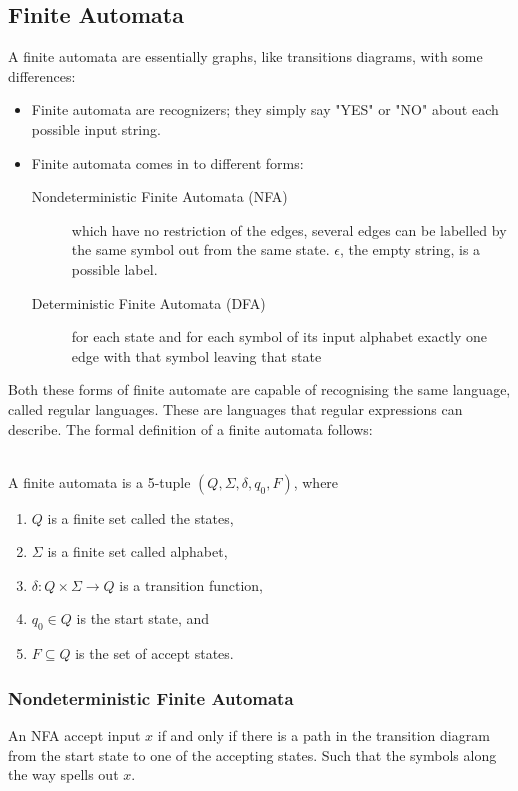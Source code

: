 \subsection{Finite Automata}
A finite automata are essentially graphs, like transitions diagrams, with some 
differences:
\begin{itemize}
  \item Finite automata are recognizers; they simply say "YES" or "NO" about 
each possible input string.
  \item Finite automata comes in to different forms:
    \begin{description}
      \item [Nondeterministic Finite Automata (NFA)] which have no restriction 
of the edges, several edges can be labelled by the same symbol out from the 
same state. $\epsilon$, the empty string, is a possible label. 
      \item [Deterministic Finite Automata (DFA)] for each state and for each 
symbol of its input alphabet exactly one edge with that symbol leaving that 
state
    \end{description}
\end{itemize}
Both these forms of finite automate are capable of recognising the same 
language, called regular languages. These are languages that regular 
expressions can describe. \cite{Aho2006}
The formal definition of a finite automata follows:
\begin{definition} \label{finiteAutomataDef} 
\cite{sipser2006} \\
A finite automata is a 5-tuple $(Q, \Sigma, \delta, q_0, F)$, where
\begin{enumerate}
  \item $Q$ is a finite set called the states,
  \item $\Sigma$ is a finite set called alphabet,
  \item $\delta: Q \times \Sigma \to Q$ is a transition function,
  \item $q_0 \in Q$ is the start state, and
  \item $F \subseteq Q$ is the set of accept states.
\end{enumerate}

\end{definition}
\subsubsection{Nondeterministic Finite Automata}
An NFA accept input $x$ if and only if there is a path in the transition 
diagram from the start state to one of the accepting states. Such that the 
symbols along the way spells out $x$. \cite{Aho2006}

